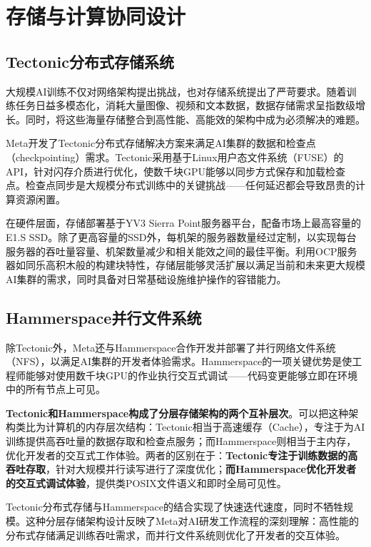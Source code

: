\section{存储与计算协同设计}

\subsection{Tectonic分布式存储系统}

大规模AI训练不仅对网络架构提出挑战，也对存储系统提出了严苛要求。随着训练任务日益多模态化，消耗大量图像、视频和文本数据，数据存储需求呈指数级增长。同时，将这些海量存储整合到高性能、高能效的架构中成为必须解决的难题。

Meta开发了Tectonic分布式存储解决方案来满足AI集群的数据和检查点（checkpointing）需求。Tectonic采用基于Linux用户态文件系统（FUSE）的API，针对闪存介质进行优化，使数千块GPU能够以同步方式保存和加载检查点。检查点同步是大规模分布式训练中的关键挑战——任何延迟都会导致昂贵的计算资源闲置。

在硬件层面，存储部署基于YV3 Sierra Point服务器平台，配备市场上最高容量的E1.S SSD。除了更高容量的SSD外，每机架的服务器数量经过定制，以实现每台服务器的吞吐量容量、机架数量减少和相关能效之间的最佳平衡。利用OCP服务器如同乐高积木般的构建块特性，存储层能够灵活扩展以满足当前和未来更大规模AI集群的需求，同时具备对日常基础设施维护操作的容错能力。

\subsection{Hammerspace并行文件系统}

除Tectonic外，Meta还与Hammerspace合作开发并部署了并行网络文件系统（NFS），以满足AI集群的开发者体验需求。Hammerspace的一项关键优势是使工程师能够对使用数千块GPU的作业执行交互式调试——代码变更能够立即在环境中的所有节点上可见。

\textbf{Tectonic和Hammerspace构成了分层存储架构的两个互补层次}。可以把这种架构类比为计算机的内存层次结构：Tectonic相当于高速缓存（Cache），专注于为AI训练提供高吞吐量的数据存取和检查点服务；而Hammerspace则相当于主内存，优化开发者的交互式工作体验。两者的区别在于：\textbf{Tectonic专注于训练数据的高吞吐存取}，针对大规模并行读写进行了深度优化；\textbf{而Hammerspace优化开发者的交互式调试体验}，提供类POSIX文件语义和即时全局可见性。

Tectonic分布式存储与Hammerspace的结合实现了快速迭代速度，同时不牺牲规模。这种分层存储架构设计反映了Meta对AI研发工作流程的深刻理解：高性能的分布式存储满足训练吞吐需求，而并行文件系统则优化了开发者的交互体验。

